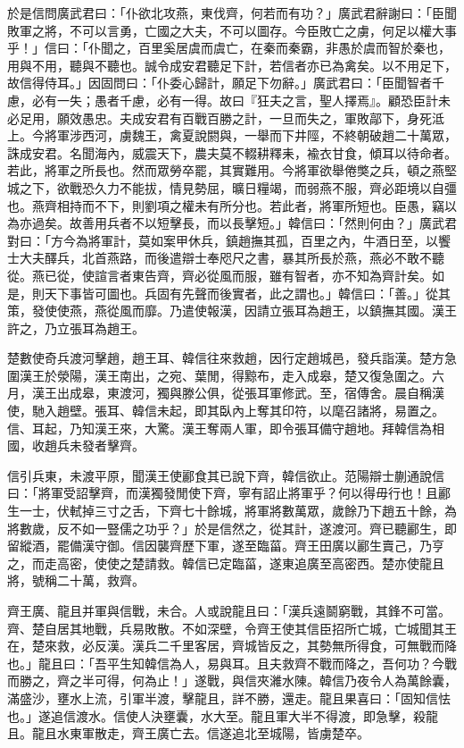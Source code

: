 \begin{pinyinscope}
於是信問廣武君曰：「仆欲北攻燕，東伐齊，何若而有功？」廣武君辭謝曰：「臣聞敗軍之將，不可以言勇，亡國之大夫，不可以圖存。今臣敗亡之虜，何足以權大事乎！」信曰：「仆聞之，百里奚居虞而虞亡，在秦而秦霸，非愚於虞而智於秦也，用與不用，聽與不聽也。誠令成安君聽足下計，若信者亦已為禽矣。以不用足下，故信得侍耳。」因固問曰：「仆委心歸計，願足下勿辭。」廣武君曰：「臣聞智者千慮，必有一失；愚者千慮，必有一得。故曰『狂夫之言，聖人擇焉』。顧恐臣計未必足用，願效愚忠。夫成安君有百戰百勝之計，一旦而失之，軍敗鄗下，身死泜上。今將軍涉西河，虜魏王，禽夏說閼與，一舉而下井陘，不終朝破趙二十萬眾，誅成安君。名聞海內，威震天下，農夫莫不輟耕釋耒，褕衣甘食，傾耳以待命者。若此，將軍之所長也。然而眾勞卒罷，其實難用。今將軍欲舉倦獘之兵，頓之燕堅城之下，欲戰恐久力不能拔，情見勢屈，曠日糧竭，而弱燕不服，齊必距境以自彊也。燕齊相持而不下，則劉項之權未有所分也。若此者，將軍所短也。臣愚，竊以為亦過矣。故善用兵者不以短擊長，而以長擊短。」韓信曰：「然則何由？」廣武君對曰：「方今為將軍計，莫如案甲休兵，鎮趙撫其孤，百里之內，牛酒日至，以饗士大夫醳兵，北首燕路，而後遣辯士奉咫尺之書，暴其所長於燕，燕必不敢不聽從。燕已從，使諠言者東告齊，齊必從風而服，雖有智者，亦不知為齊計矣。如是，則天下事皆可圖也。兵固有先聲而後實者，此之謂也。」韓信曰：「善。」從其策，發使使燕，燕從風而靡。乃遣使報漢，因請立張耳為趙王，以鎮撫其國。漢王許之，乃立張耳為趙王。

楚數使奇兵渡河擊趙，趙王耳、韓信往來救趙，因行定趙城邑，發兵詣漢。楚方急圍漢王於滎陽，漢王南出，之宛、葉閒，得黥布，走入成皋，楚又復急圍之。六月，漢王出成皋，東渡河，獨與滕公俱，從張耳軍修武。至，宿傳舍。晨自稱漢使，馳入趙壁。張耳、韓信未起，即其臥內上奪其印符，以麾召諸將，易置之。信、耳起，乃知漢王來，大驚。漢王奪兩人軍，即令張耳備守趙地。拜韓信為相國，收趙兵未發者擊齊。

信引兵東，未渡平原，聞漢王使酈食其已說下齊，韓信欲止。范陽辯士蒯通說信曰：「將軍受詔擊齊，而漢獨發閒使下齊，寧有詔止將軍乎？何以得毋行也！且酈生一士，伏軾掉三寸之舌，下齊七十餘城，將軍將數萬眾，歲餘乃下趙五十餘，為將數歲，反不如一豎儒之功乎？」於是信然之，從其計，遂渡河。齊已聽酈生，即留縱酒，罷備漢守御。信因襲齊歷下軍，遂至臨菑。齊王田廣以酈生賣己，乃亨之，而走高密，使使之楚請救。韓信已定臨菑，遂東追廣至高密西。楚亦使龍且將，號稱二十萬，救齊。

齊王廣、龍且并軍與信戰，未合。人或說龍且曰：「漢兵遠鬬窮戰，其鋒不可當。齊、楚自居其地戰，兵易敗散。不如深壁，令齊王使其信臣招所亡城，亡城聞其王在，楚來救，必反漢。漢兵二千里客居，齊城皆反之，其勢無所得食，可無戰而降也。」龍且曰：「吾平生知韓信為人，易與耳。且夫救齊不戰而降之，吾何功？今戰而勝之，齊之半可得，何為止！」遂戰，與信夾濰水陳。韓信乃夜令人為萬餘囊，滿盛沙，壅水上流，引軍半渡，擊龍且，詳不勝，還走。龍且果喜曰：「固知信怯也。」遂追信渡水。信使人決壅囊，水大至。龍且軍大半不得渡，即急擊，殺龍且。龍且水東軍散走，齊王廣亡去。信遂追北至城陽，皆虜楚卒。


\end{pinyinscope}
